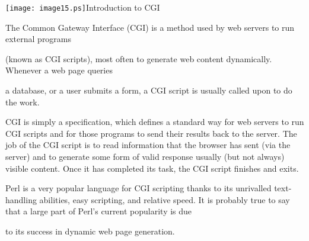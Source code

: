 \documentclass[a4paper,11pt]{book}
\begin{document}

\noindent 

\noindent 

\noindent 

\noindent 

\noindent 

\noindent 

\noindent 

\noindent 

\noindent 

\noindent 

\noindent 

\noindent 

\noindent 

\noindent 

\noindent 

\noindent \texttt{[image: image15.ps]}Introduction to CGI

\noindent 

\noindent 

\noindent 

\noindent 

\noindent The Common Gateway Interface (CGI) is a method used by web servers to run external programs

\noindent (known as CGI scripts), most often to generate web content dynamically. Whenever a web page queries

\noindent a database, or a user submits a form, a CGI script is usually called upon to do the work.

\noindent 

\noindent CGI is simply a specification, which defines a standard way for web servers to run CGI scripts and for those programs to send their results back to the server. The job of the CGI script is to read information that the browser has sent (via the server) and to generate some form of valid response usually (but not always) visible content. Once it has completed its task, the CGI script finishes and exits.

\noindent 

\noindent Perl is a very popular language for CGI scripting thanks to its unrivalled text-handling abilities, easy scripting, and relative speed. It is probably true to say that a large part of Perl's current popularity is due

\noindent to its success in dynamic web page generation.
\end{document}
